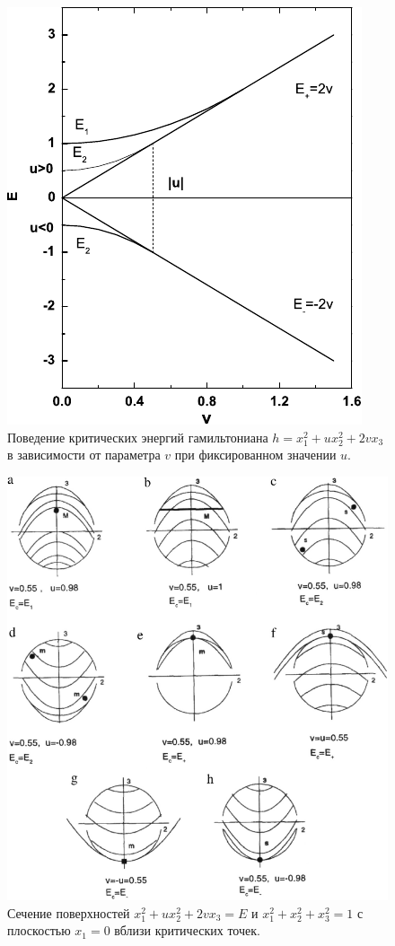 \documentclass[a4paper, 10pt, twocolumn]{article}
\begin{document}
\begin{figure}%
	\centering
	\includegraphics[width=.7\linewidth]{figures/crit-energy}
	\caption{Поведение критических энергий гамильтониана $ h = x_1^2 
	+ u x_2^2 + 2 v x_3$ в зависимости от параметра $v$ при фиксированном 
	значении $u$.}
	\label{fig:crit-e}
\end{figure}%

\begin{figure}%
	\centering
	\includegraphics[width=\linewidth]{figures/trajectories}
	\caption{Сечение поверхностей $ x_1^2 + u x_2^2 + 2 v x_3 = E $ и $x_1^2 + x_2^2 + x_3^2 = 1$ с плоскостью $x_1 = 0$ вблизи критических точек.}
	\label{fig:traj}
\end{figure}%
\end{document}
